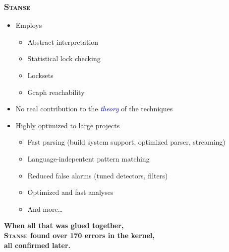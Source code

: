 \documentclass[xcolor=dvipsnames]{beamer}
\let\Oldemph\emph
\renewcommand{\emph}[1]{\textcolor{blue}{\Oldemph{#1}}}
\newcommand{\heading}[1]{\textbf{\textcolor{BurntOrange}{#1}}}
\newcommand{\stan}{\textbf{\textsc{Stanse}}\xspace}
\begin{document}
\begin{frame}
  \frametitle{\stan}

  \begin{itemize}
    \item Employs
    \begin{itemize}
      \item Abstract interpretation
      \item Statistical lock checking
      \item Locksets
      \item Graph reachability
    \end{itemize}

    \pause

    \item No real contribution to the \emph{theory} of the techniques

    \pause

    \item Highly optimized to large projects
    \begin{itemize}
      \item Fast parsing (build system support, optimized parser, streaming)
      \item Language-indepentent pattern matching
      \item Reduced false alarms (tuned detectors, filters)
      \item Optimized and fast analyses
      \item And more\dots
    \end{itemize}
  \end{itemize}

  \smallskip
  \pause

  \begin{center}
    \heading{When all that was glued together,\\
    \stan found over 170 errors in the kernel,\\
    all confirmed later.}
  \end{center}

\end{frame}

\end{document}
